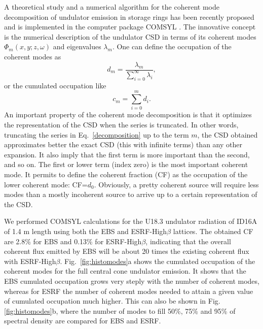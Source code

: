 \documentclass{iucr}              %
\begin{document}
A theoretical study and a numerical algorithm for the coherent mode decomposition of undulator emission in storage rings has been recently proposed  \cite{GlassThesis,GlassEPL} and is implemented in the computer package COMSYL \cite{codeCOMSYL}. The innovative concept is the numerical description of the undulator CSD in terms of its coherent modes $\Phi_m(x,y;z,\omega)$ and eigenvalues $\lambda_m $. One can define the occupation of the coherent modes as
\begin{equation}
 d_m = \frac{\lambda_m}{\sum\limits_{i=0}^{\infty} \lambda_i},
\end{equation}
or the cumulated occupation like
\begin{equation}
 c_m = \sum\limits_{i=0}^{m} d_i.
\end{equation}
An important property of the coherent mode decomposition is that it optimizes the representation of the CSD when the series is truncated. In other words, truncating the series in Eq.~\ref{decomposition} up to the term $m$, the CSD obtained approximates better the exact CSD (this with infinite terms) than any other expansion. It also imply that the first term is more important than the second, and so on. The first or lower term (index zero) is the most important coherent mode. It permits to define the coherent fraction (CF) as the occupation of the lower coherent mode: CF=$d_0$. Obviously, a pretty coherent source will require less modes than a mostly incoherent source to arrive up to a certain representation of the CSD.

We performed COMSYL calculations for the U18.3 undulator radiation of ID16A of 1.4 m length using both the EBS and ESRF-High$\beta$ lattices. The obtained CF are 2.8\% for EBS and 0.13\% for ESRF-High$\beta$, indicating that the overall coherent flux emitted by EBS will be about 20 times the existing coherent flux with ESRF-High$\beta$. Fig.~\ref{fig:histomodes}a shows the cumulated occupation of the coherent modes for the full central cone undulator emission. It shows that the EBS cumulated occupation grows very steply with the number of coherent modes, whereas for ESRF the number of coherent modes needed to attain a given value of cumulated occupation much higher. This can also be shown in Fig.\ref{fig:histomodes}b, where the number of modes to fill 50\%, 75\% and 95\% of spectral density are compared for EBS and ESRF.   
\end{document}
